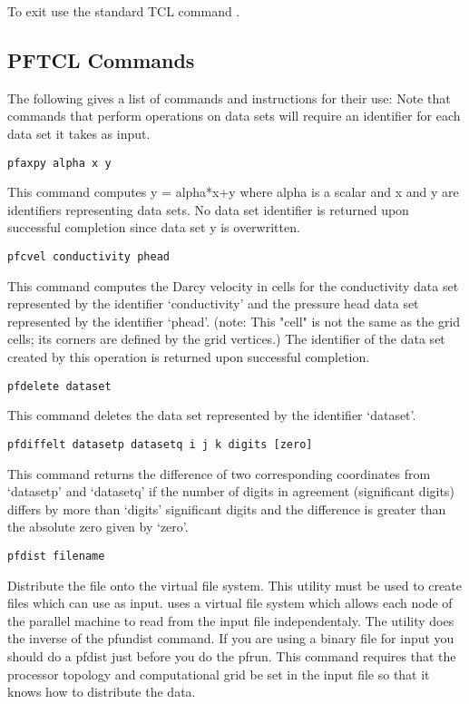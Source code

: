 To exit use the standard TCL command .

\subsection{PFTCL Commands}
\label{PFTCL Commands}
The following gives a list of \parflow{} commands and instructions for their use:
Note that commands that perform operations on data sets will
require an identifier for each data set it takes as input.

\begin{description}

\item{\begin{verbatim}pfaxpy alpha x y\end{verbatim}}
This command computes y = alpha*x+y where alpha is a scalar and x and 
y are identifiers representing data sets.  No data set identifier is
returned upon successful completion since data set y is overwritten.

\item{\begin{verbatim}pfcvel conductivity phead\end{verbatim}}
This command computes the Darcy velocity in cells for the conductivity data set
represented by the identifier `conductivity' and the pressure head
data set represented by the identifier `phead'.  (note: This "cell"
is not the same as the grid cells; its corners are defined by the
grid vertices.)  The identifier of the data set created by this
operation is returned upon successful completion.

\item{\begin{verbatim}pfdelete dataset\end{verbatim}}
This command deletes the data set represented by the identifier `dataset'.
        
\item{\begin{verbatim}pfdiffelt datasetp datasetq i j k digits [zero]\end{verbatim}}
This command returns the difference of two corresponding coordinates
from `datasetp' and `datasetq' if the number of digits in agreement
(significant digits) differs by more than `digits' significant
digits and the difference is greater than the absolute zero given     
by `zero'.


\item{\begin{verbatim}pfdist filename \end{verbatim}}
Distribute the file onto the virtual file system.  This utility must
be used to create files which \parflow{} can use as input.  \parflow{}
uses a virtual file system which allows each node of the parallel
machine to read from the input file independentaly.  The utility does
the inverse of the pfundist command.  If you are using a \parflow{}
binary file for input you should do a pfdist just before you do the
pfrun.  This command requires that the processor topology and
computational grid be set in the input file so that it knows how to
distribute the data.


\end{description}
